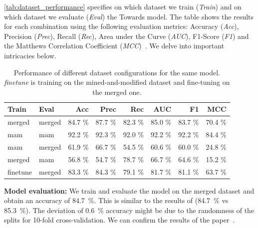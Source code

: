 \documentclass[%
class=scrreprt,
chapterprefix=false,%
open=right,%
twoside=true,%
paper=a4,%
logofile={Logo\_zentral\_farbig\_EN.png},%
thesistype=master,%
UKenglish,%
]{se2thesis}
\theoremstyle{definition}
\begin{document}
	\autoref{tab:dataset_performance} specifies on which dataset we train (\textit{Train}) and on which dataset we evaluate (\textit{Eval}) the Towards model. The table shows the results for each combination using the following evaluation metrics: Accuracy (\textit{Acc}), Precision (\textit{Prec}), Recall (\textit{Rec}), Area under the Curve (\textit{AUC}), F1-Score (\textit{F1}) and the Matthews Correlation Coefficient (\textit{MCC})~\cite{chicco2020advantages}. We delve into important intricacies below.
		
	\begin{table}[tb]
		\centering
		\caption{Performance of different dataset configurations for the same model. 
		\textit{finetune} is training on the mined-and-modified dataset and fine-tuning on the merged one.
		}
		\label{tab:dataset_performance}
		\begin{tabular}{llrrrrrr}
			\toprule
			Train & Eval & Acc & Prec & Rec & AUC & F1 & MCC \\
			\midrule
			merged      & merged   	& 84.7 \% & 87.7 \% & 82.3 \% & 85.0 \% & 83.7 \% & 70.4 \% \\
			mam        	& mam    	& 92.2 \% & 92.3 \% & 92.0 \% & 92.2 \% & 92.2 \% & 84.4 \% \\
			mam			& merged    & 61.9 \% & 66.7 \% & 54.5 \% & 60.6 \% & 60.0 \% & 24.8 \% \\
			merged      & mam	    & 56.8 \% & 54.7 \% & 78.7 \% & 66.7 \% & 64.6 \% & 15.2 \% \\
			finetune	& merged    & 83.3 \% & 84.3 \% & 79.1 \% & 81.7 \% & 81.1 \% & 63.7 \% \\
			\bottomrule
		\end{tabular}
	\end{table}
	
	\textbf{Model evaluation:}
	We train and evaluate the model on the merged dataset and obtain an accuracy of 84.7~\%. This is similar to the results of \citeauthor{mi2022towards} (84.7~\% vs 85.3~\%). The deviation of 0.6~\% accuracy might be due to the randomness of the splits for 10-fold cross-validation. We can confirm the results of the paper~\cite{mi2022towards}.
	
\end{document}
